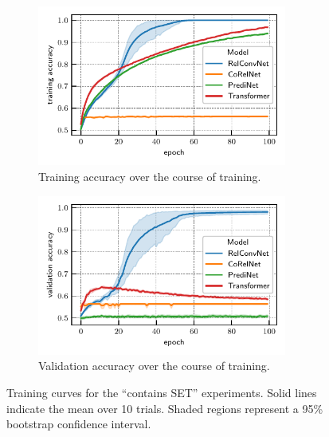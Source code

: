 \begin{figure}[ht]
    \centering
    \begin{subfigure}{0.49\textwidth}
        \centering
        \includegraphics[width=0.9\textwidth]{figs/experiments/contains_set_training_curves_trainacc.pdf}
        \caption{Training accuracy over the course of training.}\label{fig:contains_set_training_curves_trainacc}
    \end{subfigure}
    \begin{subfigure}{0.49\textwidth}
        \centering
        \includegraphics[width=0.9\textwidth]{figs/experiments/contains_set_training_curves_valacc.pdf}
        \caption{Validation accuracy over the course of training.}\label{fig:contains_set_training_curves_valacc}
    \end{subfigure}
    \caption{Training curves for the ``contains SET'' experiments. Solid lines indicate the mean over 10 trials. Shaded regions represent a 95\% bootstrap confidence interval.}\label{fig:contains_set_training_curves}
\end{figure}

